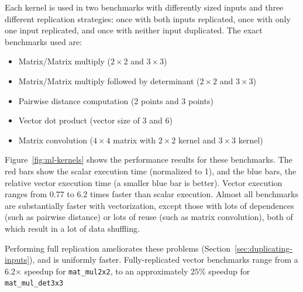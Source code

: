 Each kernel is used in two benchmarks with differently sized inputs and three different replication strategies: once with both inputs replicated, once with only one input replicated, and once with neither input duplicated. 
The exact benchmarks used are:
\begin{itemize}
    \item Matrix/Matrix multiply ($2 \times 2$ and $3 \times 3$)
    \item Matrix/Matrix multiply followed by determinant ($2 \times 2$ and $3 \times 3$)
    \item Pairwise distance computation (2 points and 3 points)
    \item Vector dot product (vector size of 3 and 6)
    \item Matrix convolution ($4 \times 4$ matrix with $2 \times 2$ kernel and $3 \times 3$ kernel)
\end{itemize}

Figure~\ref{fig:ml-kernels} shows the performance results for these benchmarks.
The red bars show the scalar execution time (normalized to 1), and the blue bars, the relative vector execution time (a smaller blue bar is better).
Vector execution ranges from 0.77 to 6.2 times faster than scalar execution.
Almost all benchmarks are substantially faster with vectorization, except those with lots of dependences (such as pairwise distance) or lots of reuse (such as matrix convolution), both of which result in a lot of data shuffling.


Performing full replication ameliorates these problems (Section~\ref{sec:duplicating-inputs}), and is uniformly faster.
Fully-replicated vector benchmarks range from a 6.2$\times$ speedup for \texttt{mat\_mul2x2}, to an approximately $25\%$ speedup for \texttt{mat\-\_mul\-\_det3x3}

